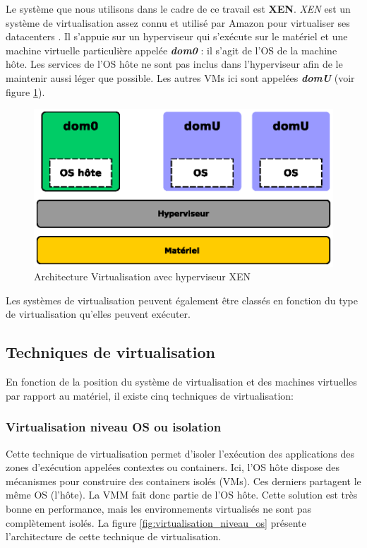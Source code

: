 \noindent Le système que nous utilisons dans le cadre de ce travail est \textbf{XEN}. \emph{XEN} est un système de virtualisation assez connu \cite{article2} et utilisé par Amazon pour virtualiser ses datacenters \cite{online4}. Il s'appuie sur un hyperviseur qui s'exécute sur le matériel et une machine virtuelle particulière appelée \textit{\textbf{dom0}} : il s'agit de l'OS de la machine hôte. Les services de l'OS hôte ne sont pas inclus dans l'hyperviseur afin de le maintenir aussi léger que possible. Les autres VMs ici sont appelées \textit{\textbf{domU}} (voir figure \ref{fig:virtualisation_xen}).\\


\begin{figure}[H]
      \centering
      \includegraphics[scale=.7]{fig1/virtualisation_xen}
      \caption{Architecture Virtualisation avec hyperviseur XEN}
      \label{fig:virtualisation_xen}
\end{figure}

\noindent Les systèmes de virtualisation peuvent également être classés en fonction du type de virtualisation qu'elles peuvent exécuter.

\subsection{Techniques de virtualisation}
En fonction de la position du système de virtualisation et des machines virtuelles par rapport au matériel, il existe cinq techniques de virtualisation:

\subsubsection{Virtualisation niveau OS ou isolation}
Cette technique de virtualisation permet d'isoler l'exécution des applications des zones d'exécution appelées contextes ou containers. Ici, l'\acs{OS} hôte dispose des mécanismes pour construire des containers isolés (VMs). Ces derniers partagent le même OS (l'hôte). La \acs{VMM} fait donc partie de l'OS hôte. Cette solution est très bonne en performance, mais les environnements virtualisés ne sont pas complètement isolés. La figure \ref{fig:virtualisation_niveau_os} présente l'architecture de cette technique de virtualisation.
    
